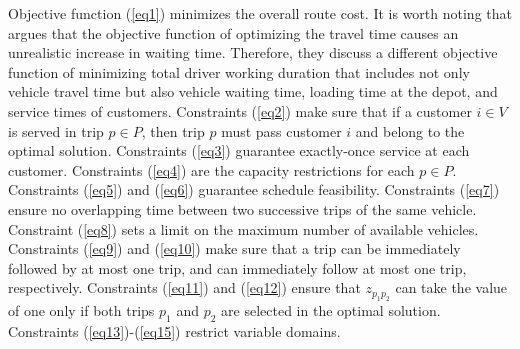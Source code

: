 
Objective function (\ref{eq1}) minimizes the overall route cost.  It is worth noting that \cite{franccois2019adaptive} argues that the objective function of optimizing the travel time causes an unrealistic increase in waiting time.  Therefore, they discuss a different objective function of minimizing total driver working duration that includes not only vehicle travel time but also vehicle waiting time, loading time at the depot, and service times of customers.  Constraints (\ref{eq2}) make sure that if a customer $i \in V$ is served in trip $p \in P$, then trip $p$ must pass customer $i$ and belong to the optimal solution. Constraints (\ref{eq3}) guarantee exactly-once service at each customer.  Constraints (\ref{eq4}) are the capacity restrictions for each $p \in P$.  Constraints (\ref{eq5}) and (\ref{eq6}) guarantee schedule feasibility.  Constraints (\ref{eq7}) ensure no overlapping time between two successive trips of the same vehicle.  Constraint (\ref{eq8}) sets a limit on the maximum number of available vehicles.  Constraints (\ref{eq9}) and (\ref{eq10}) make sure that a trip can be immediately followed by at most one trip, and can immediately follow at most one trip, respectively.  Constraints (\ref{eq11}) and (\ref{eq12}) ensure that $z_{{p_1}{p_2}}$ can take the value of one only if both trips $p_1$ and $p_2$ are selected in the optimal solution.  Constraints (\ref{eq13})-(\ref{eq15}) restrict variable domains.
\newline



